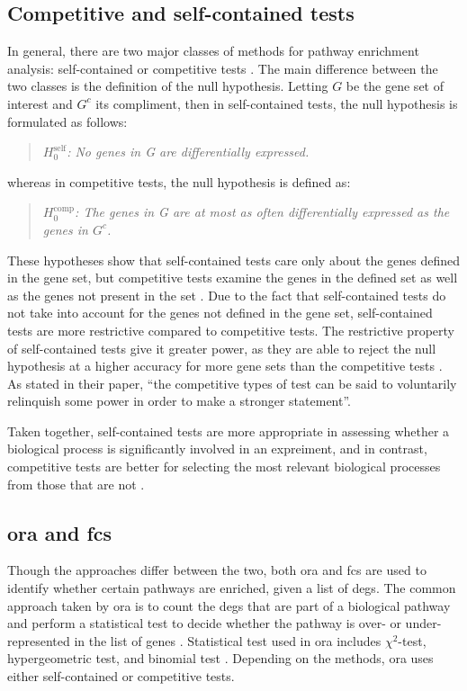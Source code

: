 \subsection{Competitive and self-contained tests}
\label{sub:competitive_and_self_contained_tests}

In general, there are two major classes of methods for pathway enrichment analysis: self-contained or competitive tests \citep{Goeman2007}.
The main difference between the two classes is the definition of the null hypothesis.
Letting $G$ be the gene set of interest and $G^c$ its compliment, then in self-contained tests, the null hypothesis is formulated as follows:
\begin{quote}
	\textit{$H_0^{\textrm{self}}$: No genes in G are differentially expressed. }
\end{quote}
whereas in competitive tests, the null hypothesis is defined as:
\begin{quote}
	\textit{$H_0^{\textrm{comp}}$: The genes in G are at most as often differentially expressed as the genes in $G^c$.
	}
\end{quote}
These hypotheses show that self-contained tests care only about the genes defined in the gene set, but competitive tests examine the genes in the defined set as well as the genes not present in the set \citep{Wu2012}.
Due to the fact that self-contained tests do not take into account for the genes not defined in the gene set, self-contained tests are more restrictive compared to competitive tests.
The restrictive property of self-contained tests give it greater power, as they are able to reject the null hypothesis at a higher accuracy for more gene sets than the competitive tests \citep{Goeman2007}.
As \citet{Goeman2007} stated in their paper, ``the competitive types of test can be said to voluntarily relinquish some power in order to make a stronger statement''.

Taken together, self-contained tests are more appropriate in assessing whether a biological process is significantly involved in an expreiment, and in contrast, competitive tests are better for selecting the most relevant biological processes from those that are not \citep{Wu2012}.

\subsection{\Gls{ora} and \gls{fcs}}
\label{sub:ora_and_fcs}

Though the approaches differ between the two, both \acrfull{ora} and \acrfull{fcs} are used to identify whether certain pathways are enriched, given a list of \glspl{deg}.
The common approach taken by \gls{ora} is to count the \glspl{deg} that are part of a biological pathway and perform a statistical test to decide whether the pathway is over- or under-represented in the list of genes \citep{Khatri2012}.
Statistical test used in \gls{ora} includes $\chi^2$-test, hypergeometric test, and binomial test \citep{Khatri2012}.
Depending on the methods, \gls{ora} uses either self-contained or competitive tests.

